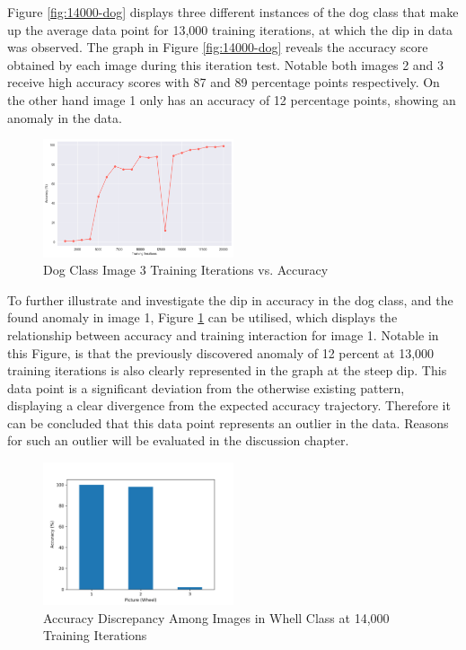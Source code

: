 Figure \ref{fig:14000-dog} displays three different instances of the dog class that make up the average data point for 13,000 training iterations, at which the dip in data was observed. The graph in Figure \ref{fig:14000-dog} reveals the accuracy score obtained by each image during this iteration test. Notable both images 2 and 3 receive high accuracy scores with 87 and 89 percentage points respectively. On the other hand image 1 only has an accuracy of 12 percentage points, showing an anomaly in the data.

\begin{figure}[h]
   \centering
   \includegraphics[width=0.5\textwidth]{../Data/dogs_image1_accuracy_vs_iteration.png}
   \caption{Dog Class Image 3 Training Iterations vs. Accuracy }
   \label{fig:image-1-accuracy}
\end{figure}

To further illustrate and investigate the dip in accuracy in the dog class, and the found anomaly in image 1,  Figure \ref{fig:image-1-accuracy} can be utilised, which displays the relationship between accuracy and training interaction for image 1. Notable in this Figure, is that the previously discovered anomaly of 12 percent at 13,000 training iterations is also clearly represented in the graph at the steep dip. This data point is a significant deviation from the otherwise existing pattern, displaying a clear divergence from the expected accuracy trajectory. Therefore it can be concluded that this data point represents an outlier in the data. Reasons for such an outlier will be evaluated in the discussion chapter. 
\newpage

\begin{figure}[h]
   \centering
   \includegraphics[width=0.5\textwidth]{../Data/wheel-outliers.png}
   \caption{Accuracy Discrepancy Among Images in Whell Class at 14,000 Training Iterations}
   \label{fig:13000-wheel}
\end{figure}

